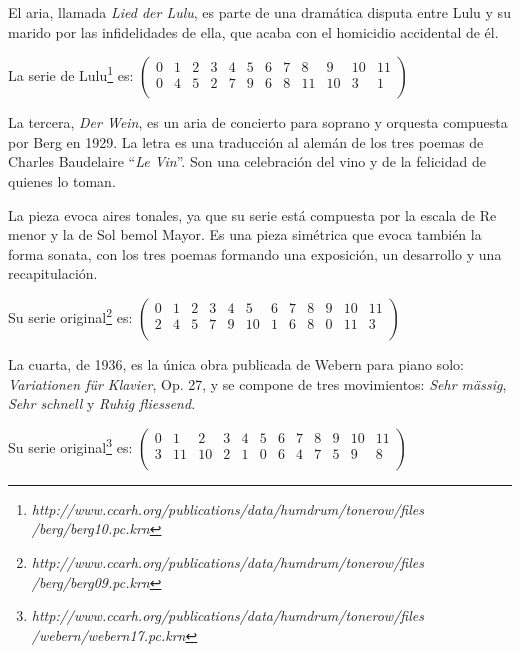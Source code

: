         El aria, llamada \textit{Lied der Lulu}, es parte de una dramática disputa entre Lulu y su marido por las infidelidades de ella, que acaba con el homicidio accidental de él.
                
        {La serie de Lulu\footnote{\textit{http://www.ccarh.org/publications/data/humdrum/tonerow/files\\/berg/berg10.pc.krn}} es:
        $\left(\begin{matrix}0&1&2&3&4&5&6&7&8&9&10&11\\0&4&5&2&7&9&6&8&11&10&3&1\\\end{matrix}\right)$}
        
        La tercera, \textit{Der Wein}, es un aria de concierto para soprano y orquesta compuesta por Berg en 1929. La letra es una traducción al alemán de los tres poemas de Charles Baudelaire ``\textit{Le Vin}''. Son una celebración del vino y de la felicidad de quienes lo toman.
        
        La pieza evoca aires tonales, ya que su serie está compuesta por la escala de Re menor y la de Sol bemol Mayor. Es una pieza simétrica que evoca también la forma sonata, con los tres poemas formando una exposición, un desarrollo y una recapitulación.
        
        {Su serie original\footnote{\textit{http://www.ccarh.org/publications/data/humdrum/tonerow/files\\/berg/berg09.pc.krn}} es:        	
        $\left(\begin{matrix}0&1&2&3&4&5&6&7&8&9&10&11\\2&4&5&7&9&10&1&6&8&0&11&3\\\end{matrix}\right)$}
        
        La cuarta, de 1936, es la única obra publicada de Webern para piano solo: \textit{Variationen für Klavier}, Op. 27, y se compone de tres movimientos: \textit{Sehr mässig}, \textit{Sehr schnell} y \textit{Ruhig fliessend}.
        
        {Su serie original\footnote{\textit{http://www.ccarh.org/publications/data/humdrum/tonerow/files\\/webern/webern17.pc.krn}} es:
       	$\left(\begin{matrix}0&1&2&3&4&5&6&7&8&9&10&11\\3&11&10&2&1&0&6&4&7&5&9&8\\\end{matrix}\right)$}
        
